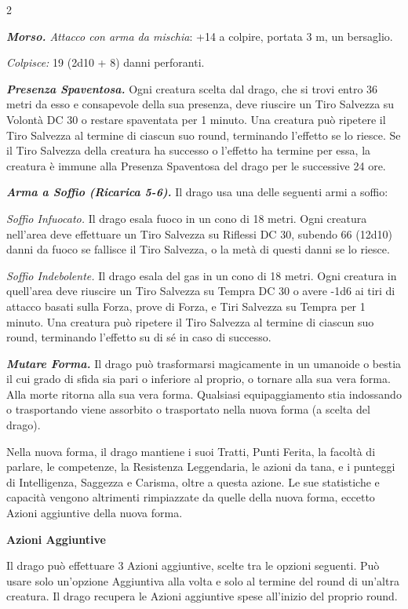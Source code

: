 \begin{multicols}{2}
{\emph{\textbf{Morso.} Attacco con arma da mischia}: +14 a colpire, portata 3 m, un bersaglio.

\emph{Colpisce:} 19 (2d10 + 8) danni perforanti.

\emph{\textbf{Presenza Spaventosa.}} Ogni creatura scelta dal drago, che si trovi entro 36 metri da esso e consapevole della sua presenza, deve riuscire un Tiro Salvezza su Volontà DC 30 o restare spaventata per 1 minuto. Una creatura può ripetere il Tiro Salvezza al termine di ciascun suo round, terminando l'effetto se lo riesce. Se il Tiro Salvezza della creatura ha successo o l'effetto ha termine per essa, la creatura è immune alla Presenza Spaventosa del drago per le successive 24 ore.

\emph{\textbf{Arma a Soffio (Ricarica 5-6).}} Il drago usa una delle seguenti armi a soffio:

\emph{Soffio Infuocato.} Il drago esala fuoco in un cono di 18 metri. Ogni creatura nell'area deve effettuare un Tiro Salvezza su Riflessi DC 30, subendo 66 (12d10) danni da fuoco se fallisce il Tiro Salvezza, o la metà di questi danni se lo riesce.

\emph{Soffio Indebolente.} Il drago esala del gas in un cono di 18 metri. Ogni creatura in quell'area deve riuscire un Tiro Salvezza su Tempra DC 30 o avere -1d6 ai tiri di attacco basati sulla Forza, prove di Forza, e Tiri Salvezza su Tempra per 1 minuto. Una creatura può ripetere il Tiro Salvezza al termine di ciascun suo round, terminando l'effetto su di sé in caso di successo.

\emph{\textbf{Mutare Forma.}} Il drago può trasformarsi magicamente in un umanoide o bestia il cui grado di sfida sia pari o inferiore al proprio, o tornare alla sua vera forma. Alla morte ritorna alla sua vera forma. Qualsiasi equipaggiamento stia indossando o trasportando viene assorbito o trasportato nella nuova forma (a scelta del drago).

Nella nuova forma, il drago mantiene i suoi Tratti, Punti Ferita, la facoltà di parlare, le competenze, la Resistenza Leggendaria, le azioni da tana, e i punteggi di Intelligenza, Saggezza e Carisma, oltre a questa azione. Le sue statistiche e capacità vengono altrimenti rimpiazzate da quelle della nuova forma, eccetto Azioni aggiuntive della nuova forma.

\textbf{Azioni Aggiuntive}

Il drago può effettuare 3 Azioni aggiuntive, scelte tra le opzioni seguenti. Può usare solo un'opzione Aggiuntiva alla volta e solo al termine del round di un'altra creatura. Il drago recupera le Azioni aggiuntive spese all'inizio del proprio round.

}
\end{multicols}
